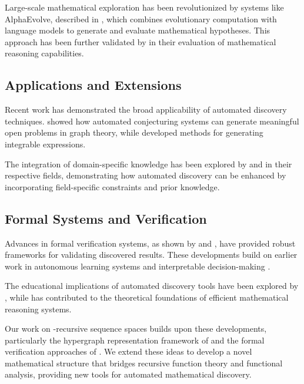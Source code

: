 Large-scale mathematical exploration has been revolutionized by systems like AlphaEvolve, described in \cite{georgiev2025mathematical}, which combines evolutionary computation with language models to generate and evaluate mathematical hypotheses. This approach has been further validated by \cite{cao2025evaluating} in their evaluation of mathematical reasoning capabilities.

\subsection{Applications and Extensions}

Recent work has demonstrated the broad applicability of automated discovery techniques. \cite{davila2025reverie} showed how automated conjecturing systems can generate meaningful open problems in graph theory, while \cite{barket2024liouville} developed methods for generating integrable expressions.

The integration of domain-specific knowledge has been explored by \cite{servia2025physicsinformed} and \cite{liu2023learning} in their respective fields, demonstrating how automated discovery can be enhanced by incorporating field-specific constraints and prior knowledge.

\subsection{Formal Systems and Verification}

Advances in formal verification systems, as shown by \cite{xu2025isamini} and \cite{wang2025malot}, have provided robust frameworks for validating discovered results. These developments build on earlier work in autonomous learning systems \cite{angelov2018autonomous} and interpretable decision-making \cite{tschernutter2022interpretable}.

The educational implications of automated discovery tools have been explored by \cite{zarzuelo2025experience}, while \cite{wang2025polybasic} has contributed to the theoretical foundations of efficient mathematical reasoning systems.

Our work on $$-recursive sequence spaces builds upon these developments, particularly the hypergraph representation framework of \cite{halachmi2024ramanujan} and the formal verification approaches of \cite{xu2025isamini}. We extend these ideas to develop a novel mathematical structure that bridges recursive function theory and functional analysis, providing new tools for automated mathematical discovery.
